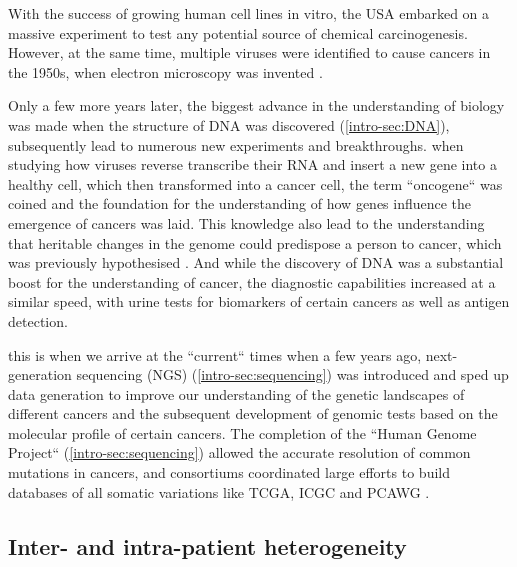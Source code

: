 With the success of growing human cell lines in vitro, the USA embarked on a massive experiment to test any potential source of chemical carcinogenesis. However, at the same time, multiple viruses were identified to cause cancers in the 1950s, when electron microscopy was invented \cite{Claude1947}.

Only a few more years later, the biggest advance in the understanding of biology was made when the structure of DNA was discovered \cite{Watson1953} (\autoref{intro-sec:DNA}),  subsequently lead to numerous new experiments and breakthroughs.  when studying how viruses  reverse transcribe their RNA and insert a new gene into a healthy cell, which then transformed into a cancer cell, the term ``oncogene`` was coined \cite{Huebner1969,Baltimore1970,Temin1970} and the foundation for the understanding of how genes influence the emergence of cancers was laid. This knowledge also lead to the understanding that heritable changes in the genome could predispose a person to cancer, which was previously hypothesised \cite{Li1969}. And while the discovery of DNA was a substantial boost for the understanding of cancer, the diagnostic capabilities increased at a similar speed, with urine tests for biomarkers of certain cancers as well as antigen detection.

 this is when we arrive at the ``current`` times when a few years ago, next-generation sequencing (NGS) (\autoref{intro-sec:sequencing}) was introduced and sped up data generation to improve our understanding of the genetic landscapes of different cancers and the subsequent development of genomic tests based on the molecular profile of certain cancers.
The completion of the ``Human Genome Project`` (\autoref{intro-sec:sequencing}) allowed the accurate resolution of common mutations in cancers, and consortiums coordinated large efforts to build databases of all somatic variations like TCGA, ICGC and PCAWG \cite{IPCAWGC2020}.

\subsection{Inter- and intra-patient heterogeneity}
\cite{Mersch2014}\cite{Li1969}\cite{Tiao2020}

